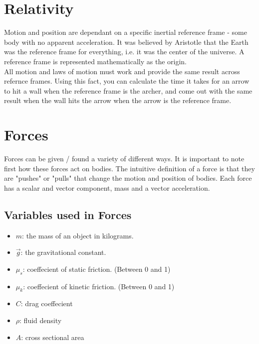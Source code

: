 \documentclass{article}
\begin{document}
\section{Relativity}
Motion and position are dependant on a specific inertial reference frame - some body with no apparent acceleration. It was believed by Aristotle that the Earth was the reference frame for everything, i.e. it was the center of the universe. A reference frame is represented mathematically as the origin.\\
All motion and laws of motion must work and provide the same result across refernce frames. Using this fact, you can calculate the time it takes for an arrow to hit a wall when the reference frame is the archer, and come out with the same result when the wall hits the arrow when the arrow is the reference frame.

\section{Forces}
Forces can be given / found a variety of different ways. It is important to note first how these forces act on bodies. The intuitive definition of a force is that they are "pushes" or "pulls" that change the motion and position of bodies. Each force has a scalar and vector component, mass and a vector acceleration.

\subsection{Variables used in Forces}
\begin{itemize}
  \item $m$: the mass of an object in kilograms.
  \item $\vec{g}$: the gravitational constant.
  \item $\mu_s$: coeffecient of static friction. (Between 0 and 1)
  \item $\mu_k$: coeffecient of kinetic friction. (Between 0 and 1)
  \item $C$: drag coeffecient
  \item $\rho$: fluid density
  \item $A$: cross sectional area
\end{itemize}
\end{document}

